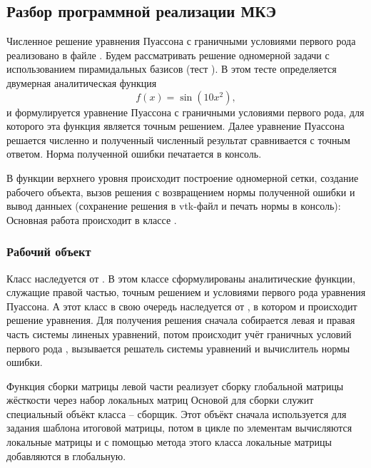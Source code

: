 \subsection{Разбор программной реализации МКЭ}
\label{sec:fem_programming}
Численное решение уравнения Пуассона с граничными
условиями первого рода реализовано в файле
.
Будем рассматривать решение одномерной задачи с использованием пирамидальных базисов (тест ).
В этом тесте определяется двумерная аналитическая функция
$$
f(x) = \sin(10 x^2),
$$
и формулируется уравнение Пуассона с граничными условиями первого рода, для которого эта функция является точным решением.
Далее уравнение Пуассона решается численно и полученный численный результат сравнивается
с точным ответом. Норма полученной ошибки печатается в консоль.

В функции верхнего уровня происходит построение одномерной
сетки, создание рабочего объекта, вызов решения с возвращением нормы полученной ошибки
и вывод данныех (сохранение решения в vtk-файл и печать нормы в консоль):
Основная работа происходит в классе .

\subsubsection{Рабочий объект}
Класс 
наследуется от . В этом классе
сформулированы аналитические функции, служащие
правой частью, точным решением и условиями первого рода уравнения Пуассона.
А этот класс в свою очередь наследуется от ,
в котором и происходит решение уравнения.
Для получения решения сначала собирается левая и правая
часть системы линеных уравнений,
потом происходит учёт граничных условий первого рода
, вызывается решатель системы уравнений и вычислитель нормы ошибки.

Функция сборки матрицы левой части реализует сборку глобальной матрицы жёсткости
через набор локальных матриц
Основой для сборки служит специальный объёкт  класса
 -- сборщик.
Этот объёкт сначала используется для задания шаблона итоговой матрицы,
потом в цикле по элементам вычисляются локальные матрицы и с
помощью метода этого класса 
локальные матрицы добавляются в глобальную.

